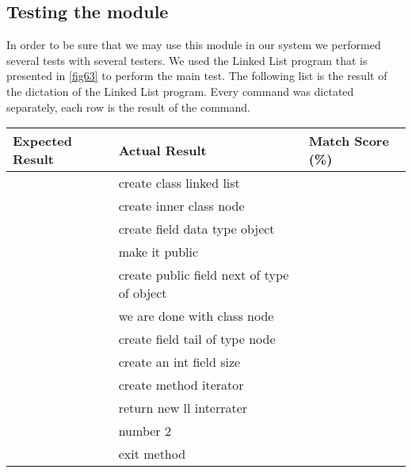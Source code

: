 \subsection{Testing the module}
In order to be sure that we may use this module in our system we performed several tests with several testers. We used the Linked List program that is presented in \autoref{fig63} to perform the main test. The following list is the result of the dictation of the Linked List program. Every command was dictated separately, each row is the result of the command.
\begin{table}[H]
\centering
\begin{tabular}{|l|l|l|}
\hline
{\bf Expected Result} & {\bf Actual Result}                             & {\bf Match Score (\%)} \\ \hline
                      & create class linked list                        &                        \\ \hline
                      & create inner class node                         &                        \\ \hline
                      & create field data type object                   &                        \\ \hline
                      & make it public                                  &                        \\ \hline
                      & create public field next of type of object      &                        \\ \hline
                      & we are done with class node                     &                        \\ \hline
                      & create field tail of type node                  &                        \\ \hline
                      & create an int field size                        &                        \\ \hline
                      & create method iterator                          &                        \\ \hline
                      & return new ll interrater                        &                        \\ \hline
                      & number 2                                        &                        \\ \hline
                      & exit method                                     &                        \\ \hline

\end{tabular}
\end{table}
